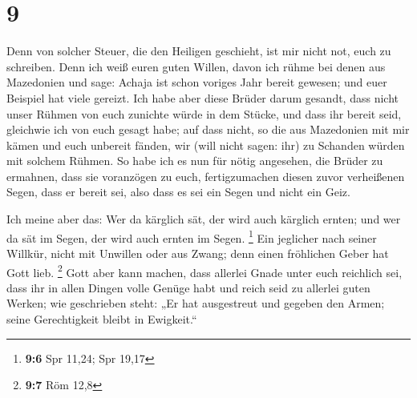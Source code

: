 \hypertarget{section-4}{%
\section{9}\label{section-4}}

 Denn von solcher Steuer, die den Heiligen geschieht, ist
mir nicht not, euch zu schreiben.  Denn ich weiß euren guten
Willen, davon ich rühme bei denen aus Mazedonien und sage: Achaja ist
schon voriges Jahr bereit gewesen; und euer Beispiel hat viele gereizt.
 Ich habe aber diese Brüder darum gesandt, dass nicht unser
Rühmen von euch zunichte würde in dem Stücke, und dass ihr bereit seid,
gleichwie ich von euch gesagt habe;  auf dass nicht, so die
aus Mazedonien mit mir kämen und euch unbereit fänden, wir (will nicht
sagen: ihr) zu Schanden würden mit solchem Rühmen.  So habe
ich es nun für nötig angesehen, die Brüder zu ermahnen, dass sie
voranzögen zu euch, fertigzumachen diesen zuvor verheißenen Segen, dass
er bereit sei, also dass es sei ein Segen und nicht ein Geiz.

 Ich meine aber das: Wer da kärglich sät, der wird auch
kärglich ernten; und wer da sät im Segen, der wird auch ernten im Segen.
\footnote{\textbf{9:6} Spr 11,24; Spr 19,17}  Ein jeglicher
nach seiner Willkür, nicht mit Unwillen oder aus Zwang; denn einen
fröhlichen Geber hat Gott lieb. \footnote{\textbf{9:7} Röm 12,8}
 Gott aber kann machen, dass allerlei Gnade unter euch
reichlich sei, dass ihr in allen Dingen volle Genüge habt und reich seid
zu allerlei guten Werken;  wie geschrieben steht: „Er hat
ausgestreut und gegeben den Armen; seine Gerechtigkeit bleibt in
Ewigkeit.``


